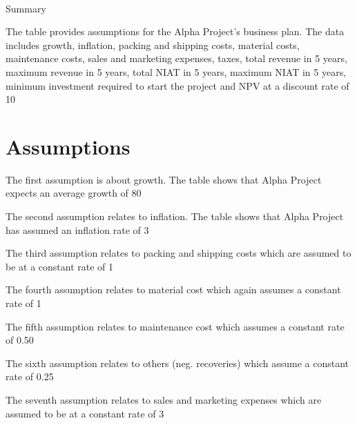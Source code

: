 \nonumsidenote\\{Summary}

The table provides assumptions for the Alpha Project's business plan. The data includes growth, inflation, packing and shipping costs, material costs, maintenance costs, sales and marketing expenses, taxes, total revenue in 5 years, maximum revenue in 5 years, total NIAT in 5 years, maximum NIAT in 5 years, minimum investment required to start the project and NPV at a discount rate of 10%

\section*{Assumptions}
The first assumption is about growth. The table shows that Alpha Project expects an average growth of 80%

The second assumption relates to inflation. The table shows that Alpha Project has assumed an inflation rate of 3%

The third assumption relates to packing and shipping costs which are assumed to be at a constant rate of 1%

The fourth assumption relates to material cost which again assumes a constant rate of 1%

The fifth assumption relates to maintenance cost which assumes a constant rate of 0.50%

The sixth assumption relates to others (neg. recoveries) which assume a constant rate of 0.25%

The seventh assumption relates to sales and marketing expenses which are assumed to be at a constant rate of 3%

